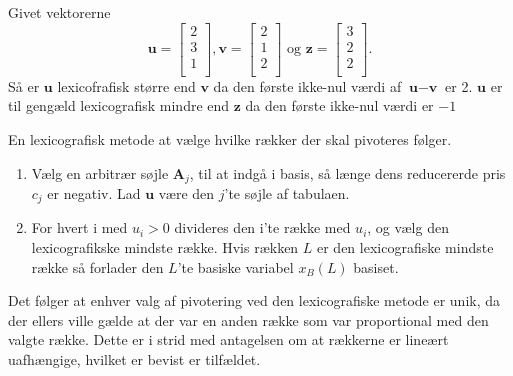 \begin{eks}\label{eks:lexi}
Givet vektorerne
$$\textbf{u}=
\begin{bmatrix}
2\\
3\\
1\\
\end{bmatrix}
,
\textbf{v}=
\begin{bmatrix}
2\\
1\\
2\\
\end{bmatrix}
\text{ og }
\textbf{z}=
\begin{bmatrix}
3\\
2\\
2\\
\end{bmatrix}
.$$
Så er $\textbf{u}$ lexicofrafisk større end $\textbf{v}$ da den første ikke-nul værdi af $\textbf{u}-\textbf{v}$ er 2.
$\textbf{u}$ er til gengæld lexicografisk mindre end $\textbf{z}$ da den første ikke-nul værdi er $-1$
\end{eks}
En lexicografisk metode at vælge hvilke rækker der skal pivoteres følger.
\begin{enumerate}
\item Vælg en arbitrær søjle $\textbf{A}_j$, til at indgå i basis, så længe dens reducererde pris $c_j$ er negativ.
Lad $\textbf{u}$ være den $j$'te søjle af tabulaen.
\item For hvert i med $u_i>0$ divideres den i'te række med $u_i$, og vælg den lexicografikske mindste række. Hvis rækken $L$ er den lexicografiske mindste række så forlader den $L$'te basiske variabel $x_B(L)$ basiset.
\end{enumerate}
Det følger at enhver valg af pivotering ved den lexicografiske metode er unik, da der ellers ville gælde at der var en anden række som var proportional med den valgte række. Dette er i strid med antagelsen om at rækkerne er lineært uafhængige, hvilket er bevist er tilfældet.



%
%
%
%